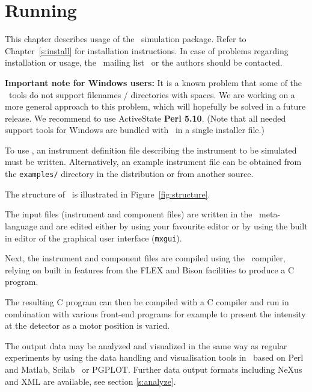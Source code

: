 
\chapter{Running \MCX}
\label{c:running}
This chapter describes usage of the \MCX\ simulation package. Refer
to Chapter~\ref{s:install} for installation instructions. In case of
problems regarding installation or usage, the \MCX\ mailing
list~\cite{mcxtrace_webpage} or the authors should be contacted.

{\bf Important note for Windows users:} It is a known problem that some of
the \MCX\ tools do not support filenames / directories with spaces.
We are working on a more general approach to this problem, which will
hopefully be solved in a future release. We recommend to use
ActiveState {\bf Perl 5.10}. (Note that all needed
support tools for Windows are bundled with \MCX\ in a single installer file.)

To use \MCX, an instrument
definition file describing the instrument to be simulated must be
written. Alternatively, an example instrument file can be obtained
from the \verb+examples/+ directory in the distribution or from
another source.

The structure of \MCX\ is illustrated in Figure~\ref{fig:structure}.

The input files (instrument and component files) are written in the \MCX\
meta-language and are edited either by using your favourite editor
or by using the built in editor of the graphical user interface
(\texttt{mxgui}).

Next, the instrument and component files are compiled using the \MCX\
compiler, relying on built in features from the FLEX and Bison facilities to produce a C program.

The resulting C program can then be
compiled with a C compiler and run in combination with various
front-end programs for example to present the intensity at the
detector as a motor position is varied.

The output data may be analyzed and visualized in the same way as
regular experiments by using the data handling and visualisation tools in \MCX\ based on
Perl and Matlab, Scilab~\cite{scilab_webpage} or PGPLOT. Further data
output formats including NeXus and XML are available, see section \ref{s:analyze}.

%

